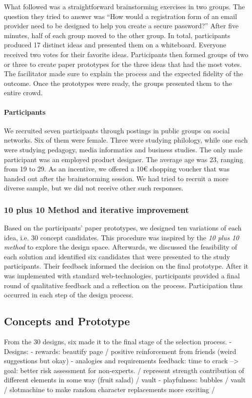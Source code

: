What followed was a straightforward brainstorming exercises in two groups. The question they tried to answer was ``How would a registration form of an email provider need to be designed to help you create a secure password?'' After five minutes, half of each group moved to the other group. In total, participants produced 17 distinct ideas and presented them on a whiteboard. Everyone received two votes for their favorite ideas. Participants then formed groups of two or three to create paper prototypes for the three ideas that had the most votes. The facilitator made sure to explain the process and the expected fidelity of the outcome. Once the prototypes were ready, the groups presented them to the entire crowd.

\paragraph{Participants}
We recruited seven participants through postings in public groups on social networks. Six of them were female. Three were studying philology, while one each were studying pedagogy, media informatics and business studies. The only male participant was an employed product designer. The average age was 23, ranging from 19 to 29. As an incentive, we offered a 10€ shopping voucher that was handed out after the brainstorming session. We had tried to recruit a more diverse sample, but we did not receive other such responses. 

\subsubsection{10 plus 10 Method and iterative improvement}
Based on the participants' paper prototypes, we designed ten variations of each idea, i.e. 30 concept candidates. This procedure was inspired by the \textit{10 plus 10 method} to explore the design space. %
Afterwards, we discussed the feasibility of each solution and identified six candidates that were presented to the study participants. Their feedback informed the decision on the final prototype. After it was implemented with standard web-technologies, participants provided a final round of qualitative feedback and a reflection on the process. Participation thus occurred in each step of the design process. 

\subsection{Concepts and Prototype}
From the 30 designs, six made it to the final stage of the selection process. 
- Designs:
- rewards: beautify page / positive reinforcement from friends (weird suggestions but okay)
- analogies and requirements feedback: time to crack --> goal: better risk assessment for non-experts. / represent strength contribution of different elements in some way (fruit salad) / vault 
- playfulness: bubbles / vault / slotmachine to make random character replacements more exciting / 

